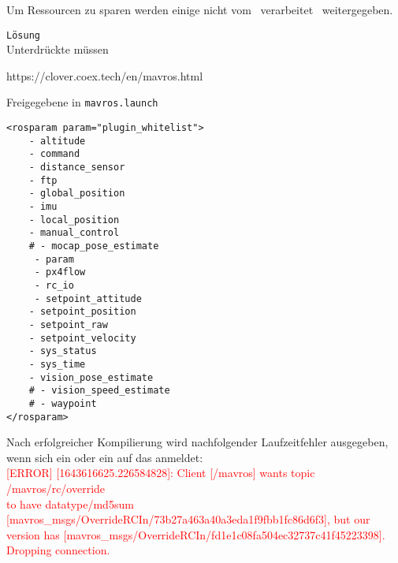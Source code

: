 



















Um Ressourcen zu sparen werden einige \Topic[s] nicht vom \Pie\ verarbeitet \bzw\ weitergegeben.

\texttt{Lösung}\\
Unterdrückte \Topic[s] müssen 
\missing[ungetested!]

https://clover.coex.tech/en/mavros.html

Freigegebene \Topic[s] in \texttt{mavros.launch}

\begin{lstlisting}[style=Style_XML, numbers=none, caption={[Freigegebene Topics] Freigegebene \Topic[s] in \texttt{mavros.launch}}]
<rosparam param="plugin_whitelist">
	- altitude
	- command
	- distance_sensor
	- ftp
	- global_position
	- imu
	- local_position
	- manual_control
	# - mocap_pose_estimate
	 - param
	 - px4flow
	 - rc_io
	 - setpoint_attitude
	- setpoint_position
	- setpoint_raw
	- setpoint_velocity
	- sys_status
	- sys_time
	- vision_pose_estimate
	# - vision_speed_estimate
	# - waypoint
</rosparam>
\end{lstlisting}


Nach erfolgreicher Kompilierung wird nachfolgender Laufzeitfehler ausgegeben, wenn sich ein  oder ein  auf das  anmeldet:\\
\textcolor{red}{[ERROR] [1643616625.226584828]: Client [/mavros] wants topic /mavros/rc/override \\to have datatype/md5sum [mavros\_msgs/OverrideRCIn/73b27a463a40a3eda1f9fbb1fc86d6f3], but our version has [mavros\_msgs/OverrideRCIn/fd1e1c08fa504ec32737c41f45223398]. Dropping connection.}

